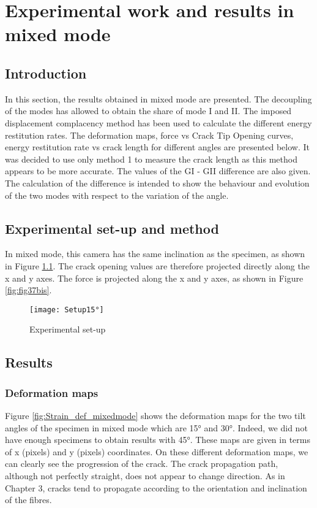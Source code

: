\chapter{Experimental work and results in mixed mode}
\label{Chapter2}

\section{Introduction}

In this section, the results obtained in mixed mode are presented. The decoupling of the modes has allowed to obtain the share of mode I and II. The imposed displacement complacency method has been used to calculate the different energy restitution rates. The deformation maps, force vs Crack Tip Opening curves, energy restitution rate vs crack length for different angles are presented below. It was decided to use only method 1 to measure the crack length as this method appears to be more accurate. The values of the GI - GII difference are also given. The calculation of the difference is intended to show the behaviour and evolution of the two modes with respect to the variation of the angle.

\section{Experimental set-up and method}

In mixed mode, this camera has the same inclination as the specimen, as shown in Figure \ref{fig:Setup15°}. The crack opening values are therefore projected directly along the x and y axes. The force is projected along the x and y axes, as shown in Figure \ref{fig:fig37bis}.

\begin{figure}[htp]
	\centering
	\texttt{[image: Setup15°]}
	\caption{Experimental set-up}
	\label{fig:Setup15°}
\end{figure}

\section{Results}

\subsection{Deformation maps}

Figure \ref{fig:Strain_def_mixedmode} shows the deformation maps for the two tilt angles of the specimen in mixed mode which are 15° and 30°. Indeed, we did not have enough specimens to obtain results with 45°. These maps are given in terms of x (pixels) and y (pixels) coordinates. On these different deformation maps, we can clearly see the progression of the crack. The crack propagation path, although not perfectly straight, does not appear to change direction. As in Chapter 3, cracks tend to propagate according to the orientation and inclination of the fibres.

